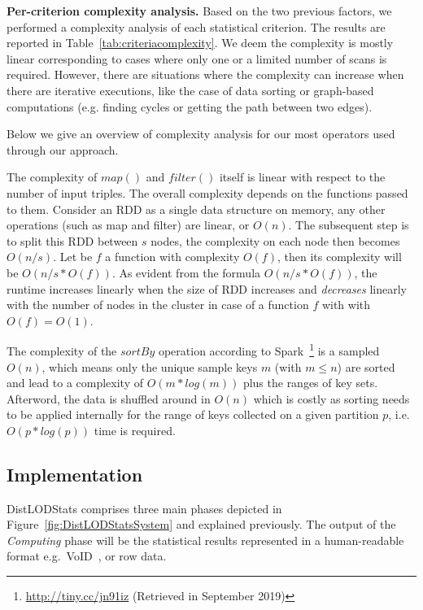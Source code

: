 \noindent
\textbf{Per-criterion complexity analysis.} Based on the two previous factors, we performed a complexity analysis of each statistical criterion. The results are reported in Table~\ref{tab:criteriacomplexity}. 
We deem the complexity is mostly linear corresponding to cases where only one or a limited number of scans is required. 
However, there are situations where the complexity can increase when there are iterative executions, like the case of data sorting or graph-based computations (e.g. finding cycles or getting the path between two edges).

\noindent
Below we give an overview of complexity analysis for our most operators used through our approach.

The complexity of $map()$ and $filter()$ itself is linear with respect to the number of input triples.
The overall complexity depends on the functions passed to them. 
Consider an \gls{RDD} as a single data structure on memory, any other operations (such as map and filter) are linear, or $O(n)$. 
The subsequent step is to split this \gls{RDD} between $s$ nodes, the complexity on each node then becomes $O(n/s)$.
Let be $f$ a function with complexity $O(f)$, then its complexity will be $O(n/s * O(f))$.
As evident from the formula $O(n/s * O(f))$, the runtime increases linearly when the size of \gls{RDD} increases and \emph{decreases} linearly with the number of nodes in the cluster in case of a function $f$ with with $O(f)=O(1)$.

The complexity of the $sortBy$ operation according to Spark~\footnote{\scriptsize \url{http://tiny.cc/jn91iz} (Retrieved in September 2019)} is a sampled $O(n)$, which means only the unique sample keys $m$ (with $m \le n$) are sorted and lead to a complexity of $O(m*log(m))$ plus the ranges of key sets. 
Afterword, the data is shuffled around in $O(n)$ which is costly as sorting needs to be applied internally for the range of keys collected on a given partition $p$, i.e.~$O(p*log(p))$ time is required.

\subsection{Implementation}
\label{subsection:implementation}
DistLODStats comprises three main phases depicted in Figure~\ref{fig:DistLODStatsSystem} and explained previously.
The output of the \emph{Computing} phase will be the statistical results represented in a human-readable format e.g.~VoID~\cite{Zhao:11:VoID}, or row data.

